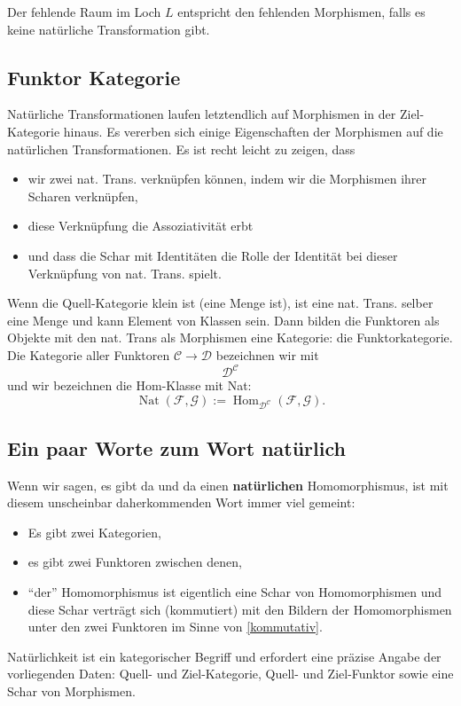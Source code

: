 \documentclass[a4paper]{amsart}
\theoremstyle{definition}
\begin{document}
Der fehlende Raum im Loch $L$ entspricht den fehlenden Morphismen, falls es keine natürliche Transformation gibt.

\subsection{Funktor Kategorie}
Natürliche Transformationen laufen letztendlich auf Morphismen in der Ziel-Kategorie hinaus. Es vererben sich einige Eigenschaften der Morphismen auf die natürlichen Transformationen. Es ist recht leicht zu zeigen, dass
\begin{itemize}
	\item wir zwei nat. Trans. verknüpfen können, indem wir die Morphismen ihrer Scharen verknüpfen,
	\item diese Verknüpfung die Assoziativität erbt
	\item und dass die Schar mit Identitäten die Rolle der Identität bei dieser Verknüpfung von nat. Trans. spielt.
\end{itemize}
Wenn die Quell-Kategorie klein ist (eine Menge ist), ist eine nat. Trans. selber eine Menge und kann Element von Klassen sein. Dann bilden die Funktoren als Objekte mit den nat. Trans als Morphismen eine Kategorie: die Funktorkategorie. Die Kategorie aller Funktoren $\mathcal C \to \mathcal D$ bezeichnen wir mit
\begin{equation*}
	\mathcal D ^{\mathcal C}
\end{equation*}
und wir bezeichnen die Hom-Klasse mit Nat:
\begin{equation*}
	\operatorname{Nat}( \mathcal F, \mathcal G) := \operatorname{Hom}_{\mathcal D ^{\mathcal C}}( \mathcal F, \mathcal G).
\end{equation*}

\subsection{Ein paar Worte zum Wort natürlich}
Wenn wir sagen, es gibt da und da einen \textbf{natürlichen} Homomorphismus, ist mit diesem unscheinbar daherkommenden Wort immer viel gemeint:
\begin{itemize}
	\item Es gibt zwei Kategorien,
	\item es gibt zwei Funktoren zwischen denen,
	\item "`der"' Homomorphismus ist eigentlich eine Schar von Homomorphismen und
	\itme diese Schar verträgt sich (kommutiert) mit den Bildern der Homomorphismen unter den zwei Funktoren im Sinne von \eqref{kommutativ}.
\end{itemize} 
Natürlichkeit ist ein kategorischer Begriff und erfordert eine präzise Angabe der vorliegenden Daten: Quell- und Ziel-Kategorie, Quell- und Ziel-Funktor sowie eine Schar von Morphismen.
\end{document}
